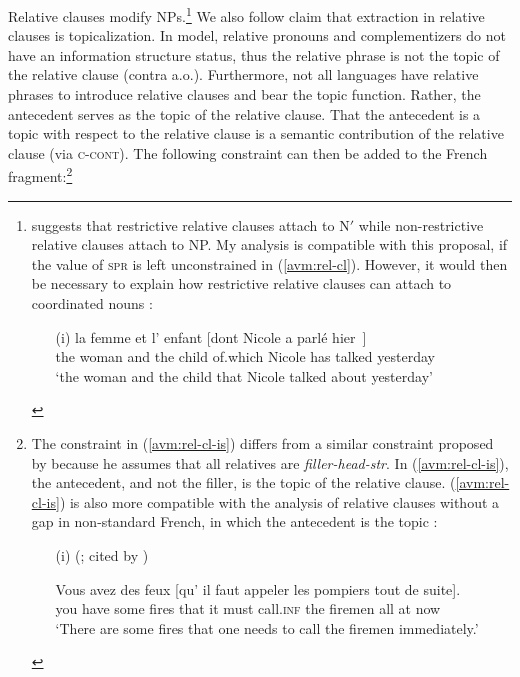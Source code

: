 Relative clauses modify NPs.\footnote{\citet{Jackendoff.1977} suggests that restrictive relative clauses attach to N$'$ while non-restrictive relative clauses attach to NP. My analysis is compatible with this proposal, if the value of \textsc{spr} is left unconstrained in (\ref{avm:rel-cl}). However, it would then be necessary to explain how restrictive relative clauses can attach to coordinated nouns \citep[293]{Kiss.2005}: 
\begin{itemize}
\item[(i)] \gll la femme et l' enfant [dont Nicole a parlé hier~\trace{}]\\
the woman and the child \sbar{}of.which Nicole has talked yesterday\\
\glt `the woman and the child that Nicole talked about yesterday'
\end{itemize}}
We also follow  claim that extraction in relative clauses is topicalization. In  model, relative pronouns and complementizers do not have an information structure status, thus the relative phrase is not the topic of the relative clause (contra \citealt{Bresnan.1987} a.o.). Furthermore, not all languages have relative phrases to introduce relative clauses and bear the topic function. Rather, the antecedent serves as the topic of the relative clause. 
That the antecedent is a topic with respect to the relative clause is a semantic contribution of the relative clause (via \textsc{c-cont}). The following constraint can then be added to the French fragment:{\footnote{\label{fn:non-standard-gapless-rc}The constraint in (\ref{avm:rel-cl-is}) differs from a similar constraint proposed by \citet[182]{Song.2017} because he assumes that all relatives are \emph{filler-head-str}. In (\ref{avm:rel-cl-is}), the antecedent, and not the filler, is the topic of the relative clause. (\ref{avm:rel-cl-is}) is also more compatible with the analysis of relative clauses without a gap in non-standard French, in which the antecedent is the topic \citep{Abeille.2007.Relatives}:
\begin{itemize}
    \item[(i)] (\citealt{Deulofeu.1981}; cited by \citealt[38]{Abeille.2007.Relatives})
    \item[] \gll Vous avez des feux [qu' il faut appeler les pompiers tout de suite].\\
    you have some fires \sbar{}that it must call.\textsc{inf} the firemen all at now\\
    \glt `There are some fires that one needs to call the firemen immediately.'
\end{itemize}
}}

